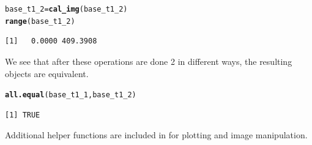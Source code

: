 \documentclass[a4paper]{report}\usepackage[]{graphicx}\usepackage[]{color}
\makeatletter
\newcommand{\hlstd}[1]{\textcolor[rgb]{0.345,0.345,0.345}{#1}}%
\newcommand{\hlkwb}[1]{\textcolor[rgb]{0.69,0.353,0.396}{#1}}%
\newcommand{\hlkwd}[1]{\textcolor[rgb]{0.737,0.353,0.396}{\textbf{#1}}}%
\newenvironment{kframe}{%
 \def\at@end@of@kframe{}%
 \ifinner\ifhmode%
  \def\at@end@of@kframe{\end{minipage}}%
  \begin{minipage}{\columnwidth}%
 \fi\fi%
 \def\FrameCommand##1{\hskip\@totalleftmargin \hskip-\fboxsep
 \colorbox{shadecolor}{##1}\hskip-\fboxsep
     \hskip-\linewidth \hskip-\@totalleftmargin \hskip\columnwidth}%
 \MakeFramed {\advance\hsize-\width
   \@totalleftmargin\z@ \linewidth\hsize
   \@setminipage}}%
 {\par\unskip\endMakeFramed%
 \at@end@of@kframe}
\newenvironment{knitrout}{}{} %
\let\pkg=\strong
\DeclareRobustCommand\code{\bgroup\@noligs\@codex}
\makeatother
\begin{document}
\begin{article}
\begin{knitrout}
\color{fgcolor}\begin{kframe}
\begin{alltt}
\hlstd{base_t1_2} \hlkwb{=} \hlkwd{cal_img}\hlstd{(base_t1_2)}
\hlkwd{range}\hlstd{(base_t1_2)}
\end{alltt}
\begin{verbatim}
[1]   0.0000 409.3908
\end{verbatim}
\end{kframe}
\end{knitrout}
We see that after these operations are done 2 in different ways, the resulting \code{nifti} objects are equivalent.  
\begin{knitrout}
\color{fgcolor}\begin{kframe}
\begin{alltt}
\hlkwd{all.equal}\hlstd{(base_t1_1, base_t1_2)}
\end{alltt}
\begin{verbatim}
[1] TRUE
\end{verbatim}
\end{kframe}
\end{knitrout}

Additional helper functions are included in \pkg{fslr} for plotting and image manipulation.









\end{article}
\end{document}

